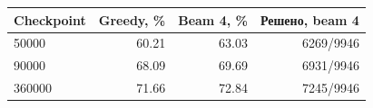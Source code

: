\begin{tabular}{lrrr}
\toprule
Checkpoint & Greedy, \% & Beam 4, \% & Решено, beam 4 \\
\midrule
50000 & 60.21 & 63.03 & 6269/9946 \\
90000 & 68.09 & 69.69 & 6931/9946 \\
360000 & 71.66 & 72.84 & 7245/9946 \\
\bottomrule
\end{tabular}
